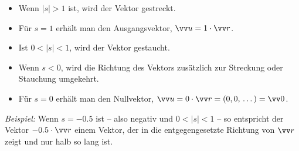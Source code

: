 \begin{itemize}[itemsep=1.5pt]
    \item Wenn $|s| > 1$ ist, wird der Vektor gestreckt.
    \item Für $s = 1$ erhält man den Ausgangsvektor, $\ivec{u} = 1\cdot \ivec{r}$.
    \item Ist $0 < |s| < 1$, wird der Vektor gestaucht.
    \item Wenn $s < 0$, wird die Richtung des Vektors zusätzlich zur Streckung oder Stauchung umgekehrt.
    \item Für $s = 0$ erhält man den Nullvektor, $\ivec{u} = 0\cdot \ivec{r} = (0,0,\,\dots) = \ivec{0}$.
\end{itemize}
\textit{Beispiel:} Wenn $s = -0.5$ ist -- also negativ und $0 < |s| < 1$ -- so entspricht der Vektor $ -0.5 \cdot \ivec{r}$ einem Vektor, der in die entgegengesetzte Richtung von $\ivec{r}$ zeigt und nur halb so lang ist.
